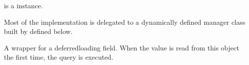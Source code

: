 \documentclass[letterpaper,10pt,spanish]{sphinxmanual}
\begin{document}
\begin{fulllineitems}
\begin{fulllineitems}
\sphinxAtStartPar
{} is a  instance.

\sphinxAtStartPar
Most of the implementation is delegated to a dynamically defined manager
class built by  defined below.

\end{fulllineitems}



\begin{fulllineitems}

\pysigstartsignatures
{}
\pysigstopsignatures
\sphinxAtStartPar
A wrapper for a deferred\sphinxhyphen{}loading field. When the value is read from this
object the first time, the query is executed.

\end{fulllineitems}



\begin{fulllineitems}

\pysigstartsignatures
{}
\pysigstopsignatures
\end{fulllineitems}


\end{fulllineitems}
\end{document}
